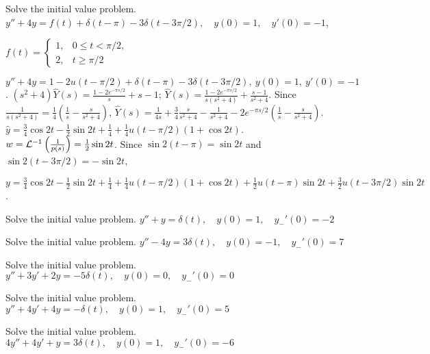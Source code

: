 \documentclass{ximera}
\begin{document}
\begin{problem}\label{exer:8.7.20}
Solve the initial value
problem.
$y''+4y=f(t)+\delta(t-\pi)-3\delta(t-3\pi/2), \quad  y(0)=1,\quad
y'(0)=-1$, 

$f(t)=\left\{\begin{array}{cl}1,&0\le t<\pi/2,\\2,&t\ge
\pi/2\end{array}\right.$

\begin{solution}
$y''+4y=1-2u(t-\pi/2)+\delta(t-\pi)-3\delta(t-3\pi/2),\ y(0)=1,\
y'(0)=-1$.
$(s^2+4)\hat Y(s)=\frac{1-2e^{-\pi s/2}}{s}+s-1$;
$\hat Y(s)=\frac{1-2e^{-\pi s/2}}{s(s^2+4)}+\frac{s-1}{s^2+4}$.
Since
$\frac{1}{s(s^2+4)}=
\frac{1}{4}\left(\frac{1}{s}-\frac{s}{s^2+4}\right)$,
$\hat Y(s)=
\frac{1}{4s}+\frac{3}{4}\frac{s}{s^2+4}-\frac{1}{s^2+4}
-2e^{-\pi s/2}\left(\frac{1}{s}-\frac{s}{s^2+4}\right)$.
$\hat
y=\frac{3}{4}\cos2t-\frac{1}{2}\sin2t+\frac{1}{4}+\frac{1}{4}u(t-\pi/2)
(1+\cos2t)$.
$w={\cal L}^{-1}\left(\frac{1}{p(s)}\right)=\frac{1}{2}\sin2t$.
Since $\sin2(t-\pi)=\sin2t$ and $\sin2(t-3\pi/2)=-\sin2t$,

$y=\frac{3}{4}\cos2t-\frac{1}{2}\sin2t+\frac{1}{4}+\frac{1}{4}u(t-\pi/2)
(1+\cos2t)+\frac{1}{2}u(t-\pi)\sin2t+\frac{3}{2}u(t-3\pi/2)\sin2t$.
\end{solution}
\end{problem}

\begin{problem}\label{exer:8.7.21}
Solve the initial value
problem.
$y''+y=\delta(t), \quad  y(0)=1,\quad y_-'(0)=-2$
\end{problem}

\begin{problem}\label{exer:8.7.22}
Solve the initial value
problem.
$y''-4y=3\delta(t), \quad  y(0)=-1,\quad y_-'(0)=7$
\end{problem}

\begin{problem}\label{exer:8.7.23}
Solve the initial value
problem.
$y''+3y'+2y=-5\delta(t), \quad  y(0)=0,\quad y_-'(0)=0$
\end{problem}

\begin{problem}\label{exer:8.7.24}
Solve the initial value
problem.
$y''+4y'+4y=-\delta(t), \quad  y(0)=1,\quad y_-'(0)=5$
\end{problem}

\begin{problem}\label{exer:8.7.25}
Solve the initial value
problem.
$4y''+4y'+y=3\delta(t), \quad  y(0)=1,\quad y_-'(0)=-6$
\end{problem}
\end{document}
